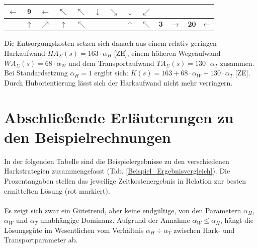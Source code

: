 \begin{center}
\begin{minipage}{\textwidth}
\begin{table}[H]
\begin{scriptsize}
\begin{tabular}{|>{}c|>{}c|>{}c|>{}c|>{}c|>{}c|>{}c|>{}c|>{}c|>{}c|>{}c|>{}c|>{}c|}
\cellcolor{blue!15!white}$\leftarrow$&\cellcolor{red!15!white}\bf{9}&\cellcolor{red!15!white}$\leftarrow$&\cellcolor{red!15!white}$\nwarrow$&\cellcolor{red!15!white}$\nwarrow$ &$\downarrow$&\cellcolor{green!15!white}$\searrow$&\cellcolor{green!15!white}$\downarrow$&\cellcolor{green!15!white}$\swarrow$\\
\hline
\cellcolor{gray!50!white}&\cellcolor{green!15!white}$\uparrow$&\cellcolor{blue!15!white}$\nearrow$&\cellcolor{blue!15!white}$\uparrow$&
\cellcolor{blue!15!white}$\nwarrow$&\cellcolor{gray!50!white}&\cellcolor{gray!50!white}&\cellcolor{red!15!white}$\uparrow$&\cellcolor{red!15!white}$\nwarrow$&\bf{3}&\cellcolor{green!15!white}$\rightarrow$&\cellcolor{green!15!white}\bf{20}&$\cellcolor{green!15!white}\leftarrow$ \\
\hline
\end{tabular}
\label{Beispiel_Harkplan_HO_BS}
\end{scriptsize} 
\end{table}
\renewcommand{\arraystretch}{1}
\end{minipage}
\end{center}

\noindent Die Entsorgungskosten setzen sich danach aus einem relativ geringen Harkaufwand $HA_{\Sigma}(s) = 163\cdot \alpha_H$ [ZE], einem höheren Wegeaufwand $WA_{\Sigma}(s) = 68\cdot \alpha_W$ und dem Transportaufwand $TA_{\Sigma}(s) = 130\cdot \alpha_T$ zusammen. Bei Standardsetzung $\alpha_H=1$ ergibt sich: $K(s) = 163 + 68 \cdot \alpha_W + 130 \cdot \alpha_T$ [ZE]. Durch Huborientierung lässt sich der Harkaufwand nicht mehr verringern. 


\section{Abschließende Erläuterungen zu den Beispielrechnungen}\label{Beispiel_Erläuterungen}

In der folgenden Tabelle sind die Beispielergebnisse zu den verschiedenen Harkstrategien zusammengefasst (Tab. \ref{Beispiel_Ergebnisvergleich}). Die Prozentangaben stellen das jeweilige Zeitkostenergebnis in Relation zur besten ermittelten Lösung (rot markiert). \\
\\
Es zeigt sich zwar ein \glqq Gütetrend\grqq{}, aber keine endgültige, von den Parametern $\alpha_H$,  $\alpha_W$ und  $\alpha_T$ unabhängige Dominanz. Aufgrund der Annahme $\alpha_W \leq \alpha_H$, hängt die Lösungsgüte im Wesentlichen vom Verhältnis $\alpha_H  \div \alpha_T$ zwischen Hark- und Transportparameter ab.

